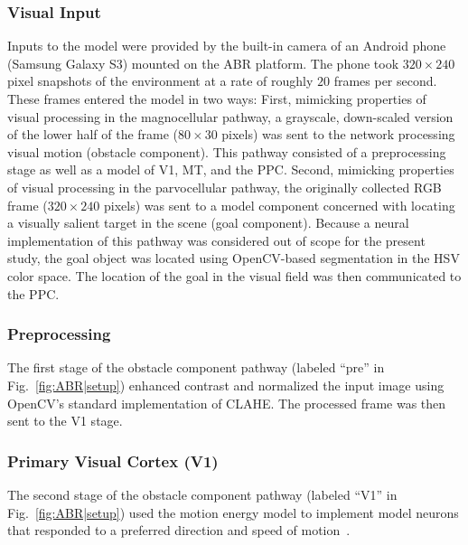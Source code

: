 \subsubsection{Visual Input}
\label{sec:ABR|model|input}
Inputs to the model were provided by the built-in camera
of an Android phone (Samsung Galaxy S3) mounted on the
\ac{ABR} platform. The phone took $320\times240$ pixel snapshots of
the environment at a rate of roughly $20$ frames per second.
These frames entered the model in two ways: First, mimicking
properties of visual processing in the magnocellular pathway, a
grayscale, down-scaled version of the lower half of the frame
($80\times30$ pixels) was sent to the network processing visual motion
(obstacle component). This pathway consisted of a preprocessing
stage as well as a model of \ac{V1}, \ac{MT}, and the \ac{PPC}.
Second, mimicking
properties of visual processing in the parvocellular pathway, the
originally collected RGB frame ($320\times240$ pixels) was sent to a
model component concerned with locating a visually salient target
in the scene (goal component). Because a neural implementation
of this pathway was considered out of scope for the present study,
the goal object was located using OpenCV-based segmentation in the
\ac{HSV} color space. The location of the goal in the visual field was then
communicated to the \ac{PPC}.


\subsubsection{Preprocessing}
\label{sec:ABR|model|preprocessing}
The first stage of the obstacle component pathway (labeled
``pre'' in Fig.~\ref{fig:ABR|setup})
enhanced contrast and normalized the input
image using OpenCV's standard implementation of \ac{CLAHE}. 
The processed frame was then sent to the \ac{V1} stage.


\subsubsection{Primary Visual Cortex (V1)}
\label{sec:ABR|model|V1}
The second stage of the obstacle component pathway (labeled
``V1'' in Fig.~\ref{fig:ABR|setup}) used the motion energy model
to implement model
neurons that responded to a preferred direction and speed of
motion~\citep{SimoncelliHeeger1998}.

